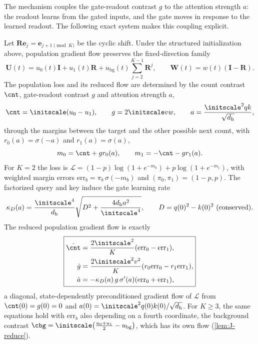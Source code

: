 The mechanism couples the gate-readout contrast $g$ to the attention strength $a$: the readout learns from the gated inputs,
and the gate moves in response to the learned readout. The following exact system makes this coupling explicit.

\begin{proposition}
\label{prop:reduced-transition}
Let $\mathbf R\bm e_j=\bm e_{j+1\pmod K}$ be the cyclic shift. Under the structured initialization above, population gradient flow
preserves the fixed-direction family
\[
 \mathbf U(t)=u_0(t)\mathbf I+u_1(t)\mathbf R
 +u_{\mathrm{bg}}(t)\sum_{j=2}^{K-1}\mathbf R^j,\qquad
 \mathbf W(t)=w(t)(\mathbf I-\mathbf R).
\]
The population loss and its reduced flow are determined by the count contrast $\cnt$, gate-readout contrast $g$ and attention
strength $a$,
\[
 \cnt=\initscale(u_0-u_1),\qquad g=2\initscale vw,\qquad a=\frac{\initscale^2qk}{\sqrt{d_{\mathrm h}}},
\]
through the margins between the target and the other possible next count, with $r_0(a)=\sigma(-a)$ and $r_1(a)=\sigma(a)$,
\[
 m_0=\cnt+g r_0(a),\qquad m_1=-\cnt-g r_1(a).
\]
For $K=2$ the loss is $\mathcal L=(1-p)\log(1+e^{-m_0})+p\log(1+e^{-m_1})$, with weighted margin errors
$\mathrm{err}_b=\pi_b\,\sigma(-m_b)$ and $(\pi_0,\pi_1)=(1-p,p)$. The factorized query and key induce the gate learning rate
\[
 \kappa_D(a)=\frac{\initscale^4}{d_{\mathrm h}}
 \sqrt{D^2+\frac{4d_{\mathrm h}a^2}{\initscale^4}},\qquad D=q(0)^2-k(0)^2\ \text{(conserved)}.
\]
The reduced population gradient flow is exactly
\begin{equation}
 \boxed{\begin{aligned}
 \dot \cnt&=\frac{2\initscale^2}{K}(\mathrm{err}_0-\mathrm{err}_1),\\
 \dot g&=\frac{2\initscale^2v^2}{K}(r_0\mathrm{err}_0-r_1\mathrm{err}_1),\\
 \dot a&=-\kappa_D(a)\,g\,\sigma'(a)(\mathrm{err}_0+\mathrm{err}_1),
 \end{aligned}}
 \label{eq:reduced-transition}
\end{equation}
a diagonal, state-dependently preconditioned gradient flow of $\mathcal L$ from $\cnt(0)=g(0)=0$ and
$a(0)=\initscale^2q(0)k(0)/\sqrt{d_{\mathrm h}}$. For $K\ge3$, the same equations hold with $\mathrm{err}_b$ also depending on a fourth
coordinate, the background contrast $\cbg=\initscale\bigl(\frac{u_0+u_1}{2}-u_{\mathrm{bg}}\bigr)$, which has its own flow
(\cref{lem:J-reduce}).
\end{proposition}

